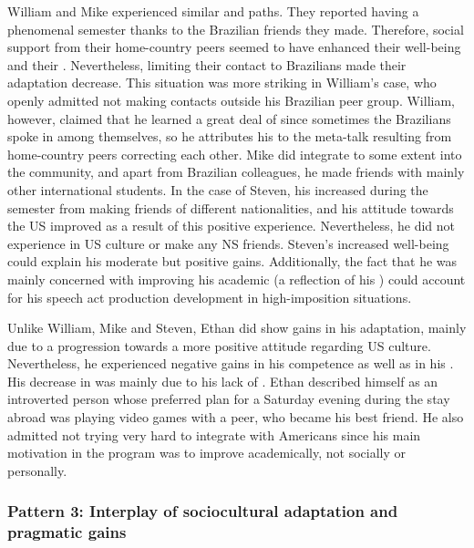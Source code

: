 \documentclass[output=paper]{langsci/langscibook}
\begin{document}
William and Mike experienced similar  and  paths. They reported having a phenomenal semester thanks to the Brazilian friends they made. Therefore, social support from their home-country peers seemed to have enhanced their well-being and their . Nevertheless, limiting their contact to Brazilians made their  adaptation decrease. This situation was more striking in William’s case, who openly admitted not making contacts outside his Brazilian peer group. William, however, claimed that he learned a great deal of  since sometimes the Brazilians spoke in  among themselves, so he attributes his  to the meta-talk resulting from home-country peers correcting each other. Mike did integrate to some extent into the  community, and apart from Brazilian colleagues, he made friends with mainly other international students. In the case of Steven, his  increased during the semester from making friends of different nationalities, and his attitude towards the US improved as a result of this positive experience. Nevertheless, he did not experience  in US culture or make any NS friends. Steven’s increased well-being could explain his moderate but positive  gains. Additionally, the fact that he was mainly concerned with improving his academic  (a reflection of his ) could account for his speech act production development in high-imposition situations. 

  
Unlike William, Mike and Steven, Ethan did show gains in his  adaptation, mainly due to a progression towards a more positive attitude regarding US culture. Nevertheless, he experienced negative gains in his  competence as well as in his . His decrease in  was mainly due to his lack of . Ethan described himself as an introverted person whose preferred plan for a Saturday evening during the stay abroad was playing video games with a  peer, who became his best friend. He also admitted not trying very hard to integrate with Americans since his main motivation in the program was to improve academically, not socially or personally.


\subsubsection{Pattern 3: Interplay of sociocultural adaptation and pragmatic gains}
\end{document}
